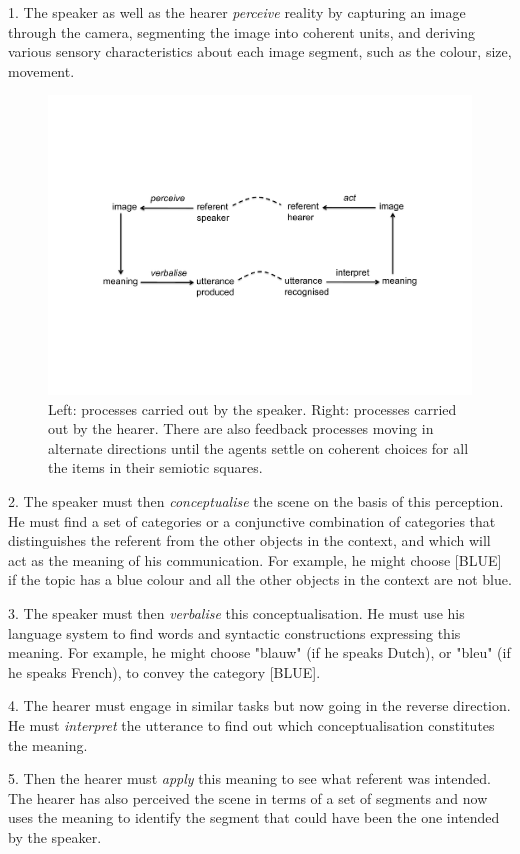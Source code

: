 1. The speaker as well as the hearer {\it perceive} reality
by capturing an image through the camera, segmenting 
the image into coherent units, and deriving various 
sensory characteristics about each image segment, 
such as the colour, size, movement. 
\begin{figure}[htbp]
  \centerline{\includegraphics[width=.85\textwidth]{chap2/figs/triangle2}}
\caption{\label{triangle2a} Left: processes carried
out by the speaker. Right: processes carried out by the hearer.
There are also feedback processes moving in alternate directions
until the agents settle on coherent choices for all the items
in their semiotic squares.}
\end{figure}

2. The speaker must then {\it conceptualise} the 
scene on the basis of this perception. He must find a set of
categories or a conjunctive combination of 
categories that distinguishes the referent from the other objects in 
the context, and which will act as the meaning of 
his communication. For example, he might choose [BLUE] if the
topic has a blue colour and all the other objects in the 
context are not blue. 

3. The speaker must then {\it verbalise} this conceptualisation. 
He must use his language system to find words and 
syntactic constructions expressing this meaning.
For example, he might choose "blauw" (if he speaks
Dutch), or "bleu" (if he speaks French),
to convey the category [BLUE]. 

4. The hearer must engage in similar tasks but now
going in the reverse direction. He must
{\it interpret} the utterance to find out which
conceptualisation constitutes the meaning. 

5. Then the hearer must {\it apply} this meaning
to see what referent was intended. The hearer has
also perceived the scene in terms of a set of 
segments and now uses 
the meaning to identify the segment that
could have been the one intended by the speaker.

